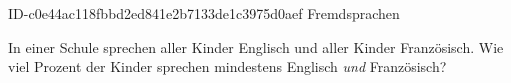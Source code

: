 \begin{exercise}
      {ID-c0e44ac118fbbd2ed841e2b7133de1c3975d0aef}
      {Fremdsprachen}
  \ifproblem\problem\par
    In einer Schule sprechen  aller Kinder Englisch und 
    aller Kinder Französisch. Wie viel Prozent der Kinder sprechen
    mindestens Englisch \emph{und} Französisch?
  \fi
\end{exercise}
